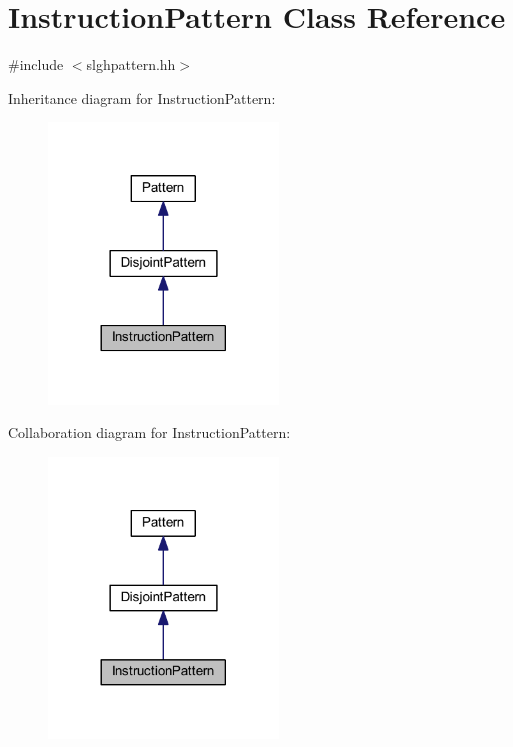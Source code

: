 \hypertarget{class_instruction_pattern}{}\section{Instruction\+Pattern Class Reference}
\label{class_instruction_pattern}


{\ttfamily \#include $<$slghpattern.\+hh$>$}



Inheritance diagram for Instruction\+Pattern\+:
\nopagebreak
\begin{figure}[H]
\begin{center}
\leavevmode
\includegraphics[width=173pt]{class_instruction_pattern__inherit__graph}
\end{center}
\end{figure}


Collaboration diagram for Instruction\+Pattern\+:
\nopagebreak
\begin{figure}[H]
\begin{center}
\leavevmode
\includegraphics[width=173pt]{class_instruction_pattern__coll__graph}
\end{center}
\end{figure}
